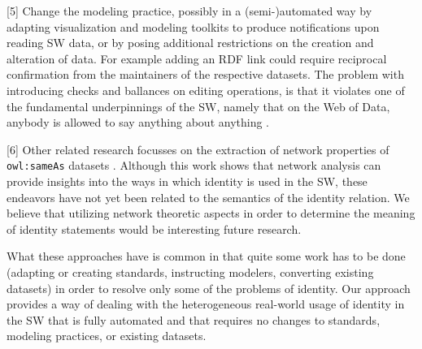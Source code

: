 [5] Change the modeling practice, possibly in a (semi-)automated way
  by adapting visualization and modeling toolkits to produce notifications
  upon reading SW data, or by posing additional restrictions on the creation
  and alteration of data. For example adding an RDF link could require
  reciprocal confirmation from the maintainers of the respective datasets.
  \cite{HalpinHayes2010,DingShinavierFininMcguinness2010}
The problem with introducing checks and ballances on editing operations,
  is that it violates one of the fundamental underpinnings of the SW,
  namely that on the Web of Data, anybody is allowed to say
  anything about anything \cite{AntoniouGrothHarmelenHoekstra2012}.

[6] Other related research focusses on the extraction of network properties
  of {\small \texttt{owl:sameAs}} datasets
  \cite{DingShinavierShangguanMcguinness2010}.
Although this work shows that network analysis can provide insights
  into the ways in which identity is used in the SW,
  these endeavors have not yet been related to the semantics of the
  identity relation.
We believe that utilizing network theoretic aspects in order to
  determine the meaning of identity statements
  would be interesting future research.

What these approaches have is common in that quite some work has to be done
  (adapting or creating standards, instructing modelers, converting existing
  datasets) in order to resolve only some of the problems of identity.
Our approach provides a way of dealing with the heterogeneous real-world
  usage of identity in the SW that is fully automated and that requires
  no changes to standards, modeling practices, or existing datasets.

